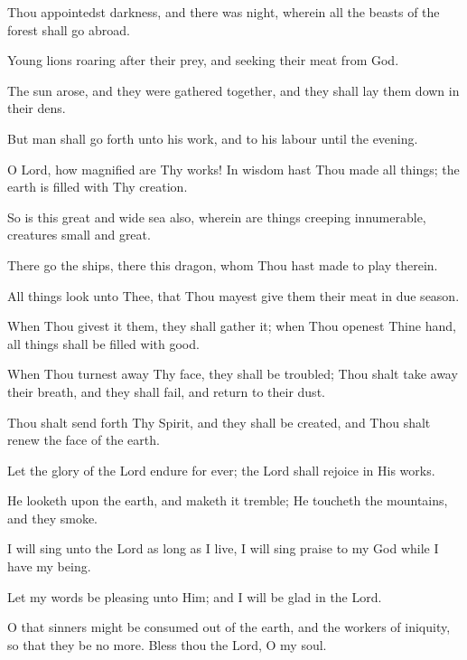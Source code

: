 Thou appointedst darkness, and there was night, wherein all the beasts of the forest shall go abroad.

Young lions roaring after their prey, and seeking their meat from God.

The sun arose, and they were gathered together, and they shall lay them down in their dens.

But man shall go forth unto his work, and to his labour until the evening.

O Lord, how magnified are Thy works! In wisdom hast Thou made all things; the earth is filled with Thy creation.

So is this great and wide sea also, wherein are things creeping innumerable, creatures small and great.

There go the ships, there this dragon, whom Thou hast made to play therein.

All things look unto Thee, that Thou mayest give them their meat in due season.

When Thou givest it them, they shall gather it; when Thou openest Thine hand, all things shall be filled with good.

When Thou turnest away Thy face, they shall be troubled; Thou shalt take away their breath, and they shall fail, and return to their dust.

Thou shalt send forth Thy Spirit, and they shall be created, and Thou shalt renew the face of the earth.

Let the glory of the Lord endure for ever; the Lord shall rejoice in His works.

He looketh upon the earth, and maketh it tremble; He toucheth the mountains, and they smoke.

I will sing unto the Lord as long as I live, I will sing praise to my God while I have my being.

Let my words be pleasing unto Him; and I will be glad in the Lord.

O that sinners might be consumed out of the earth, and the workers of iniquity, so that they be no more. Bless thou the Lord, O my soul.
